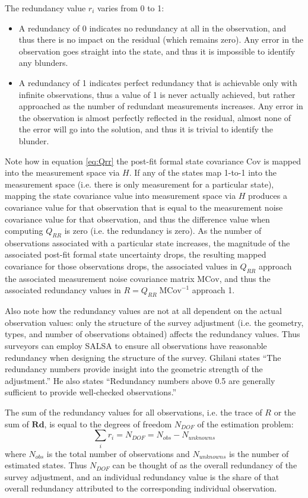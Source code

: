 The redundancy value $r_i$ varies from 0 to 1:
\begin{itemize}
	\item A redundancy of 0 indicates no redundancy at all in the observation, and thus there is no impact on the residual (which remains zero). Any error in the observation goes straight into the state, and thus it is impossible to identify any blunders.
	\item A redundancy of 1 indicates perfect redundancy that is achievable only with infinite observations, thus a value of 1 is never actually achieved, but rather approached as the number of redundant measurements increases. Any error in the observation is almost perfectly reflected in the residual, almost none of the error will go into the solution, and thus it is trivial to identify the blunder.
\end{itemize}

Note how in equation \ref{eq:Qrr} the post-fit formal state covariance $\text{Cov}$ is mapped into the measurement space via $H$. If any of the states map 1-to-1 into the measurement space (i.e. there is only measurement for a particular state), mapping the state covariance value into measurement space via $H$ produces a covariance value for that observation that is equal to the measurement noise covariance value for that observation, and thus the difference value when computing $Q_{RR}$ is zero (i.e. the redundancy is zero). As the number of observations associated with a particular state increases, the magnitude of the associated post-fit formal state uncertainty drops, the resulting mapped covariance for those observations drops, the associated values in $Q_{RR}$ approach the associated measurement noise covariance matrix $\text{MCov}$, and thus the associated redundancy values in $R = Q_{RR} \; \text{MCov}^{-1}$ approach 1. 

Also note how the redundancy values are not at all dependent on the actual observation values: only the structure of the survey adjustment (i.e. the geometry, types, and number of observations obtained) affects the redundancy values.  Thus surveyors can employ SALSA to ensure all observations have reasonable redundancy when designing the structure of the survey. Ghilani \cite{ghilani} states ``The redundancy numbers provide insight into the geometric strength of the adjustment.'' He also states ``Redundancy numbers above 0.5 are generally sufficient to provide well-checked observations.''

The sum of the redundancy values for all observations, i.e. the trace of $R$ or the sum of $\textbf{Rd}$, is equal to the degrees of freedom $N_{DOF}$ of the estimation problem:
\begin{equation}\label{eq:SumRed}
\sum_i r_i = N_{DOF} = N_{obs} - N_{unknowns}
\end{equation}
where $N_{obs}$ is the total number of observations and $N_{unknowns}$ is the number of estimated states. Thus $N_{DOF}$ can be thought of as the overall redundancy of the survey adjustment, and an individual redundancy value is the share of that overall redundancy attributed to the corresponding individual observation. 

